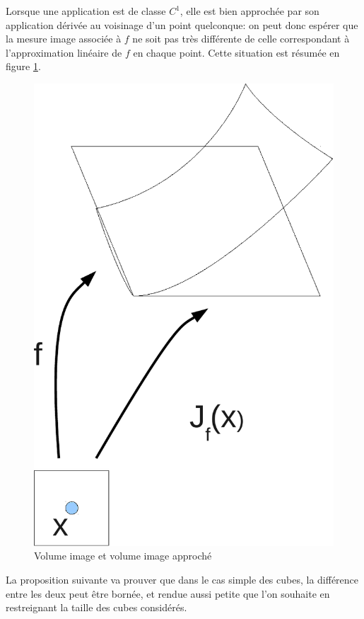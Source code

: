 Lorsque une application est de classe $C^1$, elle est bien approchée par son
application dérivée au voisinage d'un point quelconque: on peut donc espérer
que la mesure image associée à $f$ ne soit pas très différente de celle
correspondant à l'approximation linéaire de $f$ en chaque point. Cette
situation est résumée en figure \ref{ch3:2}.  
\begin{figure}[h]
 \includegraphics[scale=0.3]{images/jacobien.pdf}
\caption{Volume image et volume image approché}\label{ch3:2}
\end{figure}
La proposition suivante va prouver
que dans le cas simple des cubes, la différence entre les deux peut être bornée, 
et rendue aussi petite que l'on souhaite en restreignant
la taille des cubes considérés. 
